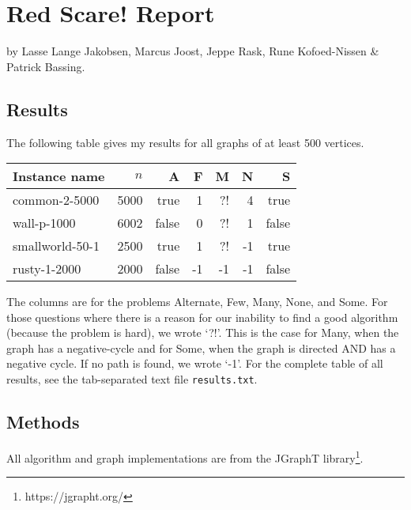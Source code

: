 \documentclass{article}
\begin{document}
\section{Red Scare! Report}

by Lasse Lange Jakobsen, Marcus Joost, Jeppe Rask, Rune Kofoed-Nissen \& Patrick Bassing.

\subsection{Results}

The following table gives my results for all graphs of at least 500 vertices.

\medskip
\begin{tabular}{lrrrrrr}
  \toprule
  Instance name & $n$ & A & F & M & N & S \\
  \midrule
  common-2-5000 & 5000 & true & 1 & ?! & 4 & true \\
  wall-p-1000 & 6002 & false & 0 & ?! & 1 & false\\
  smallworld-50-1 & 2500 & true & 1 & ?! & -1 & true\\
  rusty-1-2000 & 2000 & false & -1 & -1 & -1 & false
  \bottomrule
\end{tabular}
\medskip

\noindent The columns are for the problems Alternate, Few, Many, None, and Some.
For those questions where there is a reason for our inability to find a good algorithm (because the problem is hard), we wrote `?!'.
This is the case for Many, when the graph has a negative-cycle and for Some, when the graph is directed AND has a negative cycle.
If no path is found, we wrote `-1'.
For the complete table of all results, see the tab-separated text file {\tt results.txt}.

\subsection{Methods}
All algorithm and graph implementations are from the JGraphT library\footnote{https://jgrapht.org/}.
\end{document}
